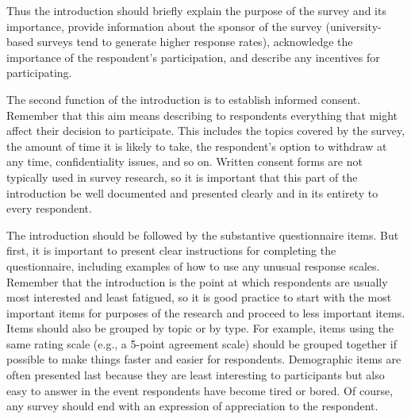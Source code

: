 Thus the introduction should briefly explain the purpose of the survey and its importance, provide information about the sponsor of the survey (university-based surveys tend to generate higher response rates), acknowledge the importance of the respondent’s participation, and describe any incentives for participating.

The second function of the introduction is to establish informed consent. Remember that this aim means describing to respondents everything that might affect their decision to participate. This includes the topics covered by the survey, the amount of time it is likely to take, the respondent’s option to withdraw at any time, confidentiality issues, and so on. Written consent forms are not typically used in survey research, so it is important that this part of the introduction be well documented and presented clearly and in its entirety to every respondent.

The introduction should be followed by the substantive questionnaire items. But first, it is important to present clear instructions for completing the questionnaire, including examples of how to use any unusual response scales. Remember that the introduction is the point at which respondents are usually most interested and least fatigued, so it is good practice to start with the most important items for purposes of the research and proceed to less important items. Items should also be grouped by topic or by type. For example, items using the same rating scale (e.g., a 5-point agreement scale) should be grouped together if possible to make things faster and easier for respondents. Demographic items are often presented last because they are least interesting to participants but also easy to answer in the event respondents have become tired or bored. Of course, any survey should end with an expression of appreciation to the respondent.


\subsection{}

